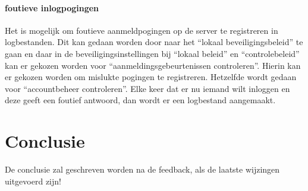\documentclass[pdftex,a4paper,12pt]{report}
\begin{document}
\subsubsection{foutieve inlogpogingen}
Het is mogelijk om foutieve aanmeldpogingen op de server te registreren in logbestanden. Dit kan gedaan worden door naar het "`lokaal beveiligingsbeleid"' te gaan en daar in de beveiligingsinstellingen bij "`lokaal beleid"' en "`controlebeleid"' kan er gekozen worden voor "`aanmeldingsgebeurtenissen controleren"'. Hierin kan er gekozen worden om mislukte pogingen te registreren. Hetzelfde wordt gedaan voor "`accountbeheer controleren"'. Elke keer dat er nu iemand wilt inloggen en deze geeft een foutief antwoord, dan wordt er een logbestand aangemaakt. 

\chapter{Conclusie}
\label{ch:conclusie}

De conclusie zal geschreven worden na de feedback, als de laatste wijzingen uitgevoerd zijn!






\listoffigures
\listoftables
\end{document}
